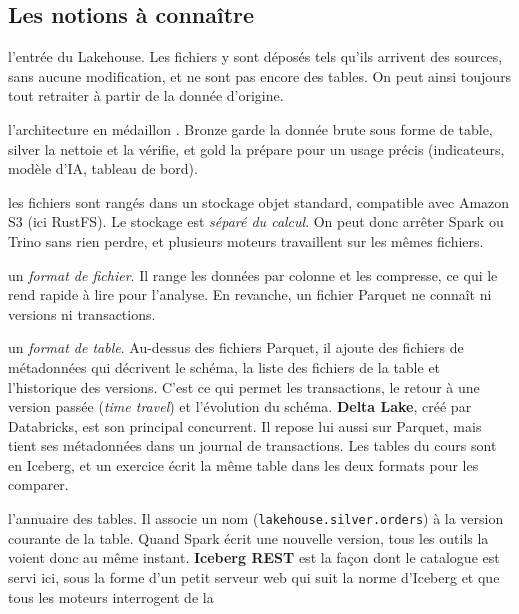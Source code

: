 \documentclass[11pt,a4paper]{article}
\begin{document}
\subsection*{Les notions à connaître}

\begin{description}[leftmargin=1.4em,labelindent=0pt,itemsep=4pt,font=\normalfont\bfseries]
\item[Zone d'atterrissage (\emph{landing}) :] l'entrée du Lakehouse. Les fichiers y sont déposés
  tels qu'ils arrivent des sources, sans aucune modification, et ne sont pas encore des tables.
  On peut ainsi toujours tout retraiter à partir de la donnée d'origine.
\item[Couches bronze, silver, gold :] l'architecture \og en médaillon \fg{}. Bronze garde la donnée
  brute sous forme de table, silver la nettoie et la vérifie, et gold la prépare pour un usage
  précis (indicateurs, modèle d'IA, tableau de bord).
\item[Stockage ouvert :] les fichiers sont rangés dans un stockage objet standard, compatible avec
  Amazon S3 (ici RustFS). Le stockage est \emph{séparé du calcul}. On peut donc arrêter Spark ou
  Trino sans rien perdre, et plusieurs moteurs travaillent sur les mêmes fichiers.
\item[Parquet :] un \emph{format de fichier}. Il range les données par colonne et les compresse, ce qui
  le rend rapide à lire pour l'analyse. En revanche, un fichier Parquet ne connaît ni versions ni
  transactions.
\item[Iceberg :] un \emph{format de table}. Au-dessus des fichiers Parquet, il ajoute des fichiers
  de métadonnées qui décrivent le schéma, la liste des fichiers de la table et l'historique des
  versions. C'est ce qui permet les transactions, le retour à une version passée (\emph{time travel})
  et l'évolution du schéma. \textbf{Delta Lake}, créé par Databricks, est son principal concurrent.
  Il repose lui aussi sur Parquet, mais tient ses métadonnées dans un journal de transactions. Les
  tables du cours sont en Iceberg, et un exercice écrit la même table dans les deux formats pour les
  comparer.
\item[Catalogue :] l'annuaire des tables. Il associe un nom (\texttt{lakehouse.silver.orders}) à la
  version courante de la table. Quand Spark écrit une nouvelle version, tous les outils la voient
  donc au même instant. \textbf{Iceberg REST} est la façon dont le catalogue est servi ici, sous la
  forme d'un petit serveur web qui suit la norme d'Iceberg et que tous les moteurs interrogent de la

\end{description}
\end{document}
